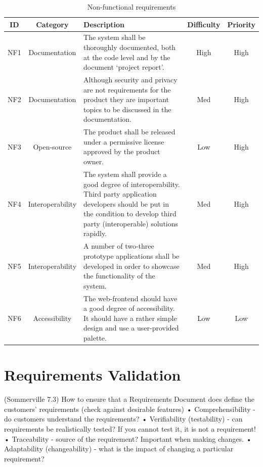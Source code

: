 \begin{table}[h]
\begin{center}
\begin{tabular}{ | c | c |p{6.5cm} | c | c |}
  \hline
  ID & Category & Description & Difficulty & Priority\\
  \hline\noalign{\smallskip}\noalign{\smallskip}\hline
  NF1 & Documentation & The system shall be thoroughly documented, both at the code level and by the document ‘project report’.
  & High & High \\
  NF2 & Documentation & Although security and privacy are not requirements for the product they are important topics to be discussed in the documentation.
  & Med & High \\
  NF3 & Open-source	& The product shall be released under a permissive license approved by the product owner.
  & Low & High \\
  NF4 & Interoperability & The system shall provide a good degree of interoperability. Third party application developers should be put in the condition to develop third party (interoperable) solutions rapidly.
  & Med & High \\
  NF5 & Interoperability & A number of two-three prototype applications shall be developed in order to showcase the functionality of the system.
  & Med & High \\
  NF6 & Accessibility & The web-frontend should have a good degree of accessibility. It should have a rather simple design and use a user-provided palette.
  & Low & Low \\
  \hline
\end{tabular}
\end{center}
\caption{Non-functional requirements}
\label{table:reqfrontend}
\end{table}


\section{Requirements Validation}
(Sommerville 7.3)
How to ensure that a Requirements Document does define 
the customers’ requirements (check against desirable 
features)
• Comprehensibility - do customers understand the 
requirements?
• Verifiability (testability) - can requirements be 
realistically tested? If you cannot test it, it is not a 
requirement!
• Traceability - source of the requirement? Important 
when making changes.
• Adaptability (changeability) - what is the impact of 
changing a particular requirement?

